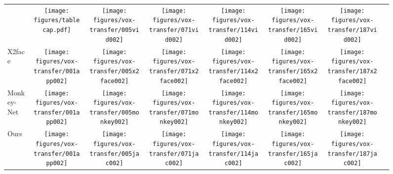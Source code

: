 \documentclass{article}
\begin{document}
\begin{figure*}[t]
{\begin{tabular}{>{\centering\arraybackslash}m{2.5cm}ccccccc}
  & \texttt{[image: figures/tablecap.pdf]}&
 \texttt{[image: figures/vox-transfer/005vid002]}&
  \texttt{[image: figures/vox-transfer/071vid002]}&
\texttt{[image: figures/vox-transfer/114vid002]}&
\texttt{[image: figures/vox-transfer/165vid002]}&
\texttt{[image: figures/vox-transfer/187vid002]}
\\
    \vspace{-1.5cm} \Large X2face~\cite{wiles2018x2face} & \texttt{[image: figures/vox-transfer/001app002]}&
 \texttt{[image: figures/vox-transfer/005x2face002]}&
  \texttt{[image: figures/vox-transfer/071x2face002]}&
\texttt{[image: figures/vox-transfer/114x2face002]}&
\texttt{[image: figures/vox-transfer/165x2face002]}&
\texttt{[image: figures/vox-transfer/187x2face002]}
\\
    \vspace{-1.5cm} \Large Monkey-Net~\cite{siarohin2018animating} & \texttt{[image: figures/vox-transfer/001app002]}&
 \texttt{[image: figures/vox-transfer/005monkey002]}&
  \texttt{[image: figures/vox-transfer/071monkey002]}&
\texttt{[image: figures/vox-transfer/114monkey002]}&
\texttt{[image: figures/vox-transfer/165monkey002]}&
\texttt{[image: figures/vox-transfer/187monkey002]}
\\
  \vspace{-1.5cm} \Large Ours& \texttt{[image: figures/vox-transfer/001app002]}&
 \texttt{[image: figures/vox-transfer/005jac002]}&
  \texttt{[image: figures/vox-transfer/071jac002]}&
\texttt{[image: figures/vox-transfer/114jac002]}&
\texttt{[image: figures/vox-transfer/165jac002]}&
\texttt{[image: figures/vox-transfer/187jac002]}
\\
\midrule
\end{tabular}
}


\end{figure*}
\end{document}
